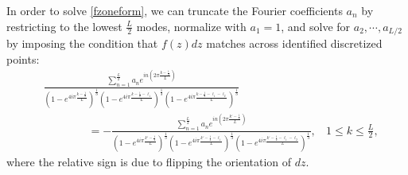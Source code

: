 \documentclass[12pt]{article}
\def\ie{\begin{equation}\begin{aligned}}
\def\fe{\end{aligned}\end{equation}}
\numberwithin{equation}{section}
\begin{document}
In order to solve \eqref{fzoneform}, we can truncate the Fourier coefficients $a_n$ by restricting to the lowest $\tfrac{L}{2}$ modes, normalize with $a_1=1$, and solve for $a_2,\cdots, a_{L/2}$ by imposing the condition that $f(z)dz$ matches across identified discretized points:
\ie
{}&\frac{\sum_{n=1}^{\frac{L}{2}} a_n e^{in (2 \pi \frac{k-\frac 12}{L})} }{(1-e^{4i\pi \frac{k-\frac12}{L}})^{\frac13} (1- e^{4i \pi \frac{k-\frac12-\ell_1}{L} })^{\frac13} (1- e^{4i\pi \frac{k-\frac12-\ell_1 -\ell_2}{L} })^{\frac13}}\\
&\qquad\qquad = - \frac{\sum_{n=1}^{\frac{L}{2}} a_n e^{in (2 \pi \frac{k'-\frac 12}{L})} }{(1-e^{4i\pi \frac{k'-\frac12}{L}})^{\frac13} (1- e^{4i \pi \frac{k'-\frac12-\ell_1}{L} })^{\frac13} (1- e^{4i\pi \frac{k'-\frac12-\ell_1 -\ell_2}{L} })^{\frac13}}, ~~~~1 \leq k \leq \tfrac{L}{2},
\fe
where the relative sign is due to flipping the orientation of $dz$. 
\end{document}
